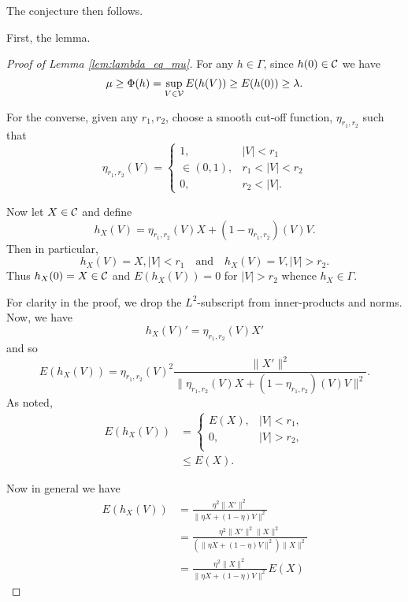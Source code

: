 \documentclass[12pt]{article}
\begin{document}
The conjecture then follows.

First, the lemma.

\begin{proof}[Proof of Lemma \ref{lem:lambda_eq_mu}]
For any \(h \in \Gamma\), since \(h(0) \in \operatorname{\mathcal{C}}\) we have
\[
\mu \geq \Phi(h) = \sup_{V \in \operatorname{\mathcal{V}}} E(h(V)) \geq E(h(0)) \geq \lambda.
\]

For the converse, given any \(r_1, r_2\), choose a smooth cut-off function, \(\eta_{r_1, r_2}\) such that
\[
\eta_{r_1, r_2} (V) = \begin{cases}
1, & |V| < r_1 \\
\in (0, 1), & r_1 < |V| < r_2 \\
0, & r_2 < |V|.
\end{cases}
\]

Now let \(X \in \operatorname{\mathcal{C}}\) and define
\[
h_X(V) = \eta_{r_1,r_2}(V) X + (1 - \eta_{r_1,r_2}) (V) V.
\]
Then in particular, 
\[
h_X(V) = X, |V| < r_1 \quad \text{and} \quad h_X(V) = V, |V| > r_2.
\]
Thus \(h_X(0) = X \in \operatorname{\mathcal{C}}\) and \(E(h_X(V)) = 0\) for \(|V| > r_2\) whence \(h_X \in \Gamma\).

For clarity in the proof, we drop the \(L^2\)-subscript from inner-products and norms. Now, we have
\[
h_X(V)' = \eta_{r_1,r_2}(V) X'
\]
and so
\[
E(h_X(V)) = \eta_{r_1,r_2}(V)^2 \frac{\|X'\|^2}{\|\eta_{r_1,r_2}(V) X + (1 - \eta_{r_1,r_2}) (V) V\|^2}.
\]
As noted,
\[
\begin{split}
E(h_X(V)) & = \begin{cases}
E(X), &|V| < r_1, \\
0, &|V| > r_2, \\
\end{cases} \\
& \leq E(X).
\end{split}
\]

Now in general we have
\[
\begin{split}
E(h_X(V)) &= \frac{\eta^2 \|X'\|^2}{\|\eta X + (1 - \eta) V\|^2} \\
&= \frac{\eta^2 \|X'\|^2\|X\|^2 }{(\|\eta X + (1 - \eta) V\|^2)\|X\|^2}\\
&= \frac{\eta^2 \|X\|^2}{\|\eta X + (1 - \eta) V\|^2} E(X)
\end{split}
\]

\end{proof}
\end{document}
